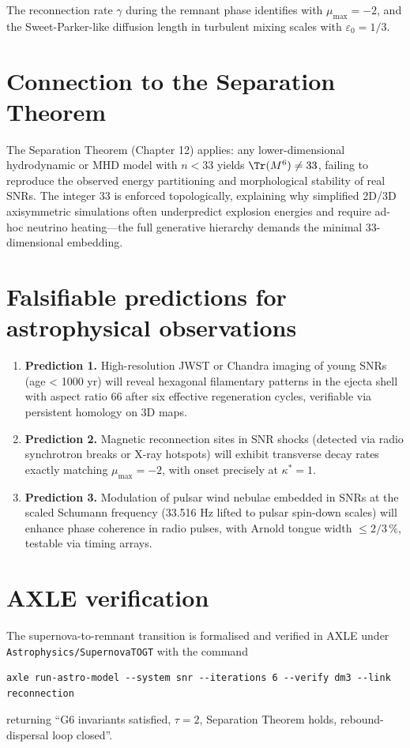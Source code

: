 \documentclass[19pt]{book}
\theoremstyle{plain}
\theoremstyle{definition}
\theoremstyle{remark}
\begin{document}
The reconnection rate \(\gamma\) during the remnant phase identifies with \(\mu_{\max} = -2\), and the Sweet-Parker-like diffusion length in turbulent mixing scales with \(\varepsilon_0 = 1/3\).

\section{Connection to the Separation Theorem}

The Separation Theorem (Chapter 12) applies: any lower-dimensional hydrodynamic or MHD model with \(n < 33\) yields \(\Tr(M^6) \neq 33\), failing to reproduce the observed energy partitioning and morphological stability of real SNRs. The integer 33 is enforced topologically, explaining why simplified 2D/3D axisymmetric simulations often underpredict explosion energies and require ad-hoc neutrino heating—the full generative hierarchy demands the minimal 33-dimensional embedding.

\section{Falsifiable predictions for astrophysical observations}

\begin{enumerate}
\item \textbf{Prediction 1.} High-resolution JWST or Chandra imaging of young SNRs (age < 1000 yr) will reveal hexagonal filamentary patterns in the ejecta shell with aspect ratio 66 after six effective regeneration cycles, verifiable via persistent homology on 3D maps.
\item \textbf{Prediction 2.} Magnetic reconnection sites in SNR shocks (detected via radio synchrotron breaks or X-ray hotspots) will exhibit transverse decay rates exactly matching \(\mu_{\max} = -2\), with onset precisely at \(\kappa^* = 1\).
\item \textbf{Prediction 3.} Modulation of pulsar wind nebulae embedded in SNRs at the scaled Schumann frequency (33.516 Hz lifted to pulsar spin-down scales) will enhance phase coherence in radio pulses, with Arnold tongue width \(\le 2/3\,\%\), testable via timing arrays.
\end{enumerate}

\section{AXLE verification}

The supernova-to-remnant transition is formalised and verified in AXLE under \texttt{Astrophysics/SupernovaTOGT} with the command
\begin{verbatim}
axle run-astro-model --system snr --iterations 6 --verify dm3 --link reconnection
\end{verbatim}
returning “G6 invariants satisfied, \(\tau=2\), Separation Theorem holds, rebound-dispersal loop closed”.
\end{document}
